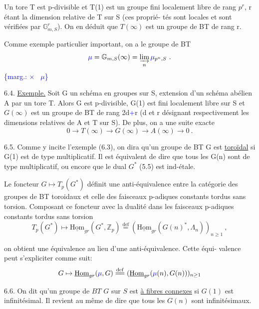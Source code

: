 \documentclass[11pt]{article}
\newcommand{\scanpage}[1]{\par\bigskip\noindent{\small\sffamily[scan #1]}\par}
\newcommand{\mspage}[1]{{\small\sffamily[p.\,#1]}}
\newcommand{\hand}[1]{\textcolor{blue}{#1}}
\newcommand{\margin}[1]{\textcolor{blue}{\{\textsf{marg.:} #1\}}}
\newcommand{\uline}[1]{\underline{#1}}
\begin{document}
Un tore  T  est p-divisible et  T(1)  est un groupe fini localement libre
de rang  $p^{r}$,  r  étant la dimension relative de  T  sur  S  (ces proprié-%
tés sont locales et sont vérifiées par  $\mathbb{G}^{r}_{m,S}$).  On en déduit que  $T(\infty)$
est un groupe de  BT  de rang  r.

Comme exemple particulier important, on a le groupe de  BT
\[ \hand{\mu} = \mathbb{G}_{m,S}(\infty) = \varinjlim_{n} \hand{\mu}_{p^{n},S} \ . \]
\margin{$\times$ \ $\mu$}

6.4.  \uline{Exemple.}  Soit  G  un schéma en groupes sur  S,  extension d'un
schéma abélien  A  par un tore  T.  Alors  G  est p-divisible,  G(1)  est
fini localement libre sur  S  et  $G(\infty)$  est un groupe de  BT  de rang
2d\hand{+}r  (d  et  r  désignant respectivement les dimensions relatives de  A
et  T  sur  S).  De plus, on a une suite exacte
\[ 0 \to T(\infty) \to G(\infty) \to A(\infty) \to 0 \ . \]

6.5.  Comme y incite l'exemple (6.3), on dira qu'un groupe de  BT
G  est \uline{toroïdal} si  G(1)  est de type multiplicatif.  Il est équivalent
de dire que tous les  G(n)  sont de type multiplicatif, ou encore que le
dual  $G^{*}$  (5.5) est ind-étale.

Le foncteur  $G \mapsto T_{p}(G^{*})$  définit une anti-équivalence entre la
catégorie des groupes de  BT  toroidaux et celle des faisceaux p-adiques
constants tordus sans torsion.  Composant ce foncteur avec la dualité
dans les faisceaux p-adiques constants tordus sans torsion
\[ T_{p}(G^{*}) \mapsto \underline{\mathrm{Hom}}_{gr}(G^{*},\mathbb{Z}_{p}) \overset{\text{def}}{=} (\underline{\mathrm{Hom}}_{gr}(G(n)^{*},\Lambda_{n}))_{n\geq 1} \ , \]

\mspage{\hand{69}}

\clearpage
\scanpage{129/70}
\mspage{\hand{III-15}}

on obtient une équivalence au lieu d'une anti-équivalence. Cette équi-%
valence peut s'expliciter comme suit:
\[
G \mapsto \underline{\mathrm{Hom}}_{gr}(\hand{\mu},G) \overset{\mathrm{def}}{=\!=} (\underline{\mathrm{Hom}}_{gr}(\hand{\mu}(n),G(n)))_{n\geq 1}
\]

6.6. On dit qu'un groupe de $BT$ $G$ sur $S$ est \uline{à fibres connexes}
si $G(1)$ est infinitésimal. Il revient au même de dire que tous les
$G(n)$ sont infinitésimaux.
\end{document}
